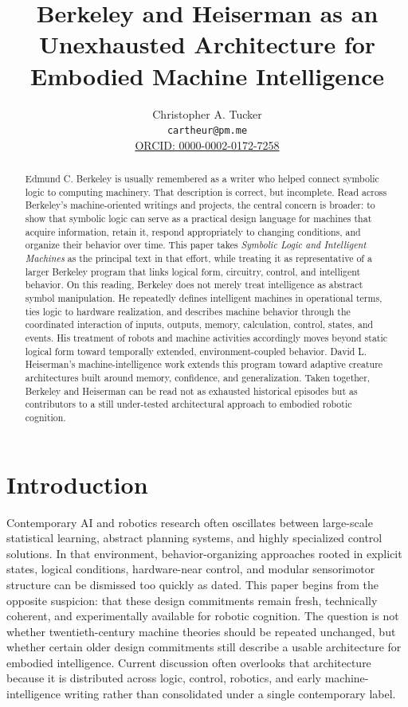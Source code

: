\documentclass[11pt]{article}
\title{Berkeley and Heiserman as an Unexhausted Architecture for\\
Embodied Machine Intelligence}
\author{Christopher A. Tucker\\
\small \texttt{cartheur@pm.me}\\
\small \href{https://orcid.org/0000-0002-0172-7258}{ORCID: 0000-0002-0172-7258}}
\date{}
\begin{document}
\maketitle

\begin{abstract}
Edmund C. Berkeley is usually remembered as a writer who helped connect symbolic logic to computing machinery. That description is correct, but incomplete. Read across Berkeley's machine-oriented writings and projects, the central concern is broader: to show that symbolic logic can serve as a practical design language for machines that acquire information, retain it, respond appropriately to changing conditions, and organize their behavior over time. This paper takes \emph{Symbolic Logic and Intelligent Machines} as the principal text in that effort, while treating it as representative of a larger Berkeley program that links logical form, circuitry, control, and intelligent behavior. On this reading, Berkeley does not merely treat intelligence as abstract symbol manipulation. He repeatedly defines intelligent machines in operational terms, ties logic to hardware realization, and describes machine behavior through the coordinated interaction of inputs, outputs, memory, calculation, control, states, and events. His treatment of robots and machine activities accordingly moves beyond static logical form toward temporally extended, environment-coupled behavior. David L. Heiserman's machine-intelligence work extends this program toward adaptive creature architectures built around memory, confidence, and generalization. Taken together, Berkeley and Heiserman can be read not as exhausted historical episodes but as contributors to a still under-tested architectural approach to embodied robotic cognition.
\end{abstract}

\onehalfspacing

\section{Introduction}

Contemporary AI and robotics research often oscillates between large-scale statistical learning, abstract planning systems, and highly specialized control solutions. In that environment, behavior-organizing approaches rooted in explicit states, logical conditions, hardware-near control, and modular sensorimotor structure can be dismissed too quickly as dated. This paper begins from the opposite suspicion: that these design commitments remain fresh, technically coherent, and experimentally available for robotic cognition. The question is not whether twentieth-century machine theories should be repeated unchanged, but whether certain older design commitments still describe a usable architecture for embodied intelligence. Current discussion often overlooks that architecture because it is distributed across logic, control, robotics, and early machine-intelligence writing rather than consolidated under a single contemporary label.
\end{document}
